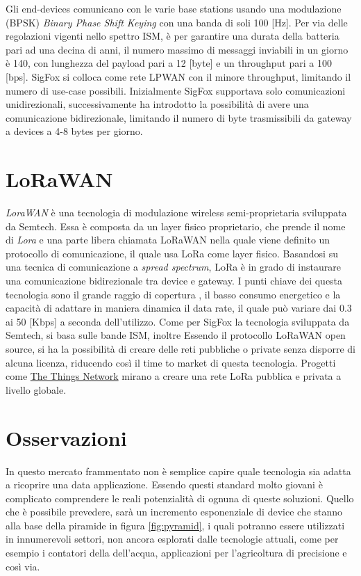 Gli end-devices comunicano con le varie base stations usando una modulazione (BPSK)
\emph{Binary Phase Shift Keying} con una banda di soli 100 [Hz]. 
Per via delle regolazioni vigenti nello spettro ISM, è per garantire una durata
della batteria pari ad una decina di anni, il numero massimo di messaggi
inviabili in un giorno è 140, con lunghezza del payload pari a 12 [byte] e un
throughput pari a 100 [bps]. SigFox si colloca come rete LPWAN con il minore
throughput, limitando il numero di use-case possibili. Inizialmente SigFox
supportava solo comunicazioni unidirezionali, successivamente ha introdotto la
possibilità di avere una comunicazione bidirezionale, limitando il numero di
byte trasmissibili da gateway a devices a 4-8 bytes per giorno.

\section{LoRaWAN}
\emph{LoraWAN} è una tecnologia di modulazione wireless semi-proprietaria 
sviluppata da Semtech. Essa è composta da un layer fisico proprietario, che
prende il nome di \emph{Lora}\cite{LoRaCss101}  e una parte libera chiamata 
LoRaWAN\cite{LoRaWAN101} nella quale viene definito un protocollo di comunicazione, 
il quale usa LoRa come layer fisico. 
Basandosi su una tecnica di comunicazione a \emph{spread spectrum}, LoRa è in
grado di instaurare una comunicazione bidirezionale tra device e gateway.
I punti chiave dei questa tecnologia sono il grande raggio di copertura , il 
basso consumo energetico e la capacità di adattare in maniera dinamica il
data rate, il quale può variare dai 0.3 ai 50 [Kbps] a seconda dell'utilizzo. 
Come per SigFox la tecnologia sviluppata da Semtech, si basa sulle bande ISM,
inoltre Essendo il protocollo LoRaWAN open source, si ha la possibilità di
creare delle reti pubbliche o private senza disporre di alcuna licenza, 
riducendo così il time to market di questa tecnologia.  
Progetti come \href{https://www.thethingsnetwork.org/}{The Things Network}
mirano a creare una rete LoRa pubblica e privata  a livello globale.

\section{Osservazioni}
In questo mercato frammentato non è semplice capire quale tecnologia sia adatta
a ricoprire una data applicazione. Essendo questi standard molto giovani è
complicato comprendere le reali potenzialità di ognuna di queste soluzioni.
Quello che è possibile prevedere, sarà un incremento esponenziale di device che
stanno alla base della piramide in figura \ref{fig:pyramid}, i  quali
potranno essere utilizzati in innumerevoli settori, non ancora esplorati dalle
tecnologie attuali, come per esempio i contatori della dell'acqua, applicazioni
per l'agricoltura di precisione e così via. 

